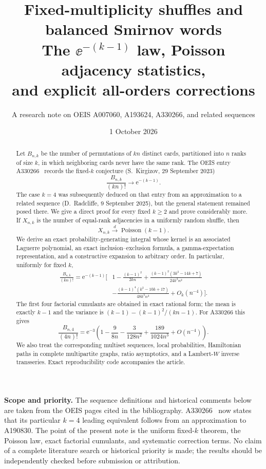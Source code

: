 \documentclass[11pt,letterpaper]{article}
\title{Fixed-multiplicity shuffles and balanced Smirnov words\\[0.45em]
\large The $\ee^{-(k-1)}$ law, Poisson adjacency statistics,\\
and explicit all-orders corrections}
\author{A research note on OEIS A007060, A193624, A330266, and related sequences}
\date{1 October 2026}
\theoremstyle{definition}
\theoremstyle{remark}
\newcommand{\ee}{\mathrm e}
\newcommand{\Pois}{\operatorname{Poisson}}
\begin{document}
\maketitle
\thispagestyle{empty}

\begin{abstract}
Let $B_{n,k}$ be the number of permutations of $kn$ distinct cards, partitioned
into $n$ ranks of size $k$, in which neighboring cards never have the same
rank.  The OEIS entry A330266~\cite{oeis330266} records the fixed-$k$
conjecture (S.~Kirgizov, 29 September 2023)
\[
  \frac{B_{n,k}}{(kn)!}\longrightarrow \ee^{-(k-1)}.
\]
The case $k=4$ was subsequently deduced on that entry from an approximation
to a related sequence (D.~Radcliffe, 9 September 2025), but the general
statement remained posed there.  We
give a direct proof for every fixed $k\ge2$ and prove considerably more.
If $X_{n,k}$ is the number of equal-rank adjacencies in a uniformly random
shuffle, then
\[
  X_{n,k}\xrightarrow{d}\Pois(k-1).
\]
We derive an exact probability-generating integral whose kernel is an
associated Laguerre polynomial, an exact inclusion--exclusion formula, a
gamma-expectation representation, and a constructive expansion to arbitrary
order.  In particular, uniformly for fixed $k$,
\[
\begin{aligned}
\frac{B_{n,k}}{(kn)!}=\ee^{-(k-1)}\bigg[&
1-\frac{(k-1)^2}{2kn}
+\frac{(k-1)^2(3k^2-14k+7)}{24k^2n^2}\\
&-\frac{(k-1)^4(k^2-10k+17)}{48k^3n^3}
+O_k(n^{-4})\bigg].
\end{aligned}
\]
The first four factorial cumulants are obtained in exact rational form; the
mean is exactly $k-1$ and the variance is
$(k-1)-(k-1)^2/(kn-1)$.  For A330266 this gives
\[
\frac{B_{n,4}}{(4n)!}=\ee^{-3}\left(1-\frac{9}{8n}
-\frac{3}{128n^2}+\frac{189}{1024n^3}+O(n^{-4})\right).
\]
We also treat the corresponding multiset sequences, local probabilities,
Hamiltonian paths in complete multipartite graphs, ratio asymptotics, and a
Lambert-$W$ inverse transseries.  Exact reproducibility code accompanies the
article.
\end{abstract}

\vfill
\small
\textbf{Scope and priority.}
The sequence definitions and historical comments below are taken from the
OEIS pages cited in the bibliography.  A330266~\cite{oeis330266} now states that its particular
$k=4$ leading equivalent follows from an approximation to A190830.  The point
of the present note is the uniform fixed-$k$ theorem, the Poisson law, exact
factorial cumulants, and systematic correction terms.  No claim of a complete
literature search or historical priority is made; the results should be
independently checked before submission or attribution.
\normalsize
\end{document}
